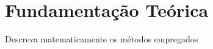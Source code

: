\chapter{Fundamentação Teórica}
\label{cap:Fundamentacao_Teorica}

Descreva matematicamente os métodos empregados